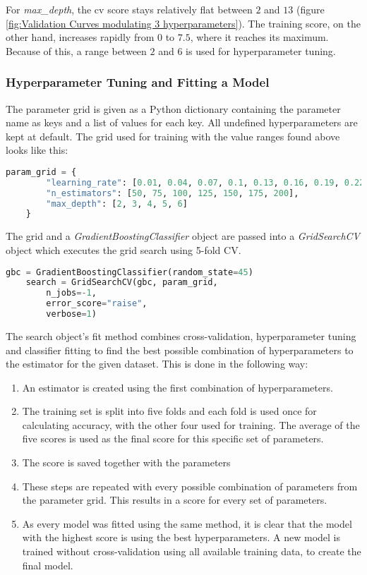 For \emph{max\_depth}, the cv score stays relatively flat between $2$ and $13$ (figure \ref{fig:Validation Curves modulating 3 hyperparameters}).
The training score, on the other hand, increases rapidly from $0$ to $7.5$, where it reaches its maximum.
Because of this, a range between $2$ and $6$ is used for hyperparameter tuning.

\subsubsection{Hyperparameter Tuning and Fitting a Model}

The parameter grid is given as a Python dictionary containing the parameter name as keys and a list of values for
each key. All undefined hyperparameters are kept at default.
The grid used for training with the value ranges found above looks like this:

\begin{lstlisting}[language=Python]
    param_grid = {
        "learning_rate": [0.01, 0.04, 0.07, 0.1, 0.13, 0.16, 0.19, 0.22, 0.25],
        "n_estimators": [50, 75, 100, 125, 150, 175, 200],
        "max_depth": [2, 3, 4, 5, 6]
    }
\end{lstlisting}

The grid and a \emph{GradientBoostingClassifier} object are passed into a \emph{GridSearchCV} object
which executes the grid search using 5-fold CV.

\begin{lstlisting}[language=Python]
    gbc = GradientBoostingClassifier(random_state=45)    
    search = GridSearchCV(gbc, param_grid,
        n_jobs=-1,
        error_score="raise",
        verbose=1)
\end{lstlisting}

The search object's fit method combines cross-validation, hyperparameter tuning and classifier
fitting to find the best possible combination of hyperparameters to the estimator for the given dataset.
This is done in the following way:

\begin{enumerate}
    \item An estimator is created using the first combination of hyperparameters.
    \item The training set is split into five folds and each fold is used once for calculating accuracy,
    with the other four used for training. The average of the five scores is used as the final score for
    this specific set of parameters.
    \item The score is saved together with the parameters
    \item These steps are repeated with every possible combination of parameters from the 
    parameter grid. This results in a score for every set of parameters.
    \item As every model was fitted using the same method, it is clear that the model with the highest
    score is using the best hyperparameters. A new model is trained without cross-validation using all
    available training data, to create the final model.
\end{enumerate}

